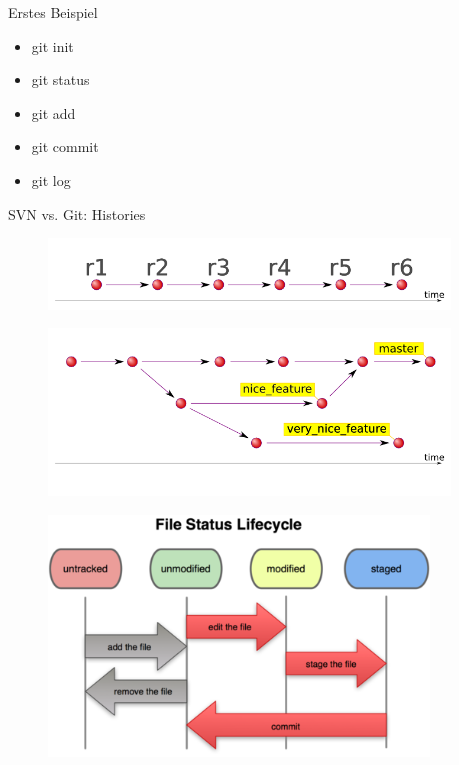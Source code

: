 \documentclass{beamer}
\begin{document}
\begin{frame}

  \begin{block}{Erstes Beispiel}
    \begin{itemize}
      \item git init
      \item git status
      \item git add
      \item git commit
      \item git log
    \end{itemize}
  \end{block} 

\end{frame}

\begin{frame}{SVN vs. Git: Histories}

  \begin{figure}
   \includegraphics[width=0.95\textwidth]{./images/svn-timeline.png}
  \end{figure}

  \begin{figure}
   \includegraphics[width=0.95\textwidth]{./images/git-timeline.png}
  \end{figure}

\end{frame}

\begin{frame}

 \begin{figure}
  \includegraphics[width=0.90\textwidth]{./images/file-status-lifecycle.png}
 \end{figure}

\end{frame}
\end{document}
